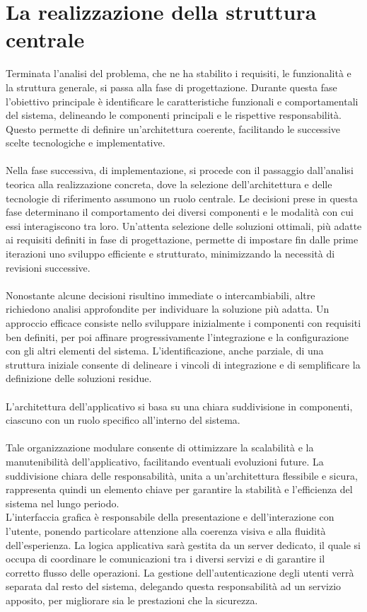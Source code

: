 \chapter{La realizzazione della struttura centrale}

Terminata l'analisi del problema, che ne ha stabilito i requisiti, le funzionalità e la struttura generale,
si passa alla fase di progettazione.
Durante questa fase l'obiettivo principale è identificare le caratteristiche funzionali e comportamentali del sistema, delineando le componenti principali e le rispettive responsabilità.
Questo permette di definire un'architettura coerente, facilitando le successive scelte tecnologiche e implementative.\\
\\
Nella fase successiva, di implementazione, si procede con il passaggio dall’analisi teorica alla realizzazione concreta,
dove la selezione dell’architettura e delle tecnologie di riferimento assumono un ruolo centrale.
Le decisioni prese in questa fase determinano il comportamento dei diversi componenti e le modalità con cui essi interagiscono tra loro.
Un’attenta selezione delle soluzioni ottimali, più adatte ai requisiti definiti in fase di progettazione,
permette di impostare fin dalle prime iterazioni uno sviluppo efficiente e strutturato, minimizzando la necessità di revisioni successive.\\
\\
Nonostante alcune decisioni risultino immediate o intercambiabili, altre richiedono analisi approfondite per individuare la soluzione più adatta.
Un approccio efficace consiste nello sviluppare inizialmente i componenti con requisiti ben definiti,
per poi affinare progressivamente l'integrazione e la configurazione con gli altri elementi del sistema.
L'identificazione, anche parziale, di una struttura iniziale consente di delineare i vincoli di integrazione e di semplificare la definizione delle soluzioni residue.\\
\\
L’architettura dell’applicativo si basa su una chiara suddivisione in componenti, ciascuno con un ruolo specifico all’interno del sistema.\\
\\
Tale organizzazione modulare consente di ottimizzare la scalabilità e la manutenibilità dell’applicativo,
facilitando eventuali evoluzioni future.
La suddivisione chiara delle responsabilità, unita a un’architettura flessibile e sicura,
rappresenta quindi un elemento chiave per garantire la stabilità e l’efficienza del sistema nel lungo periodo.\\
\clearpage
L'interfaccia grafica è responsabile della presentazione e dell’interazione con l’utente, 
ponendo particolare attenzione alla coerenza visiva e alla fluidità dell’esperienza.
La logica applicativa sarà gestita da un server dedicato, 
il quale si occupa di coordinare le comunicazioni tra i diversi servizi
e di garantire il corretto flusso delle operazioni.
La gestione dell’autenticazione degli utenti verrà separata dal resto del sistema, 
delegando questa responsabilità ad un servizio apposito,
per migliorare sia le prestazioni che la sicurezza.\\
\\

